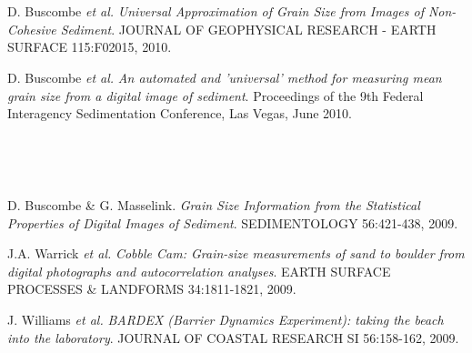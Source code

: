 \documentclass{article} %
\def\sf{\sffamily}
\def\sl{\slshape}
\newlength\sidebarwidth
\newcommand{\subtopic}[3][]
	 {\begin{minipage}{\textwidth}
	 \vspace*{.4\baselineskip}
         \nopagebreak\hspace{0in}%
         \nopagebreak\begin{minipage}[t]{\sidebarwidth - .2cm}
         \raggedleft {\sf\fontseries{sbc}\selectfont #2}
         {\\[-0.2\baselineskip] \textcolor{gray}{\footnotesize #1}}
	 \end{minipage}%
	 \hfill
	 \begin{minipage}[t]{\linewidth - \sidebarwidth}
	 #3%
	 \end{minipage}%
	 \vspace*{.2\baselineskip plus 1\baselineskip minus
	 .2\baselineskip}%
	 \end{minipage}}
\begin{document}
\subtopic{\hspace*{-3ex} 2010}{~
  \begin{itemize}[leftmargin=0ex, itemsep=0ex, parsep=.5ex, labelindent=-4ex]

    \publication
      D. Buscombe {\sl et al.}
      {\sl Universal Approximation of Grain Size from Images of Non-Cohesive Sediment}.
      JOURNAL OF GEOPHYSICAL RESEARCH - EARTH SURFACE 115:F02015, 2010.

    \publication
      D. Buscombe {\sl et al.}
      {\sl An automated and 'universal' method for measuring mean grain size from a digital image of sediment}.
      Proceedings of the 9th Federal Interagency Sedimentation Conference, Las Vegas, June 2010.

    \end{itemize}
}

\subtopic{\hspace*{-3ex} 2009}{~
  \begin{itemize}[leftmargin=0ex, itemsep=0ex, parsep=.5ex, labelindent=-4ex]

    \publication
      D. Buscombe \& G. Masselink.
      {\sl Grain Size Information from the Statistical Properties of Digital Images of Sediment}.
      SEDIMENTOLOGY 56:421-438, 2009.

    \publication
      J.A. Warrick {\sl et al.}
      {\sl Cobble Cam: Grain-size measurements of sand to boulder from digital photographs and autocorrelation analyses}.
      EARTH SURFACE PROCESSES \& LANDFORMS 34:1811-1821, 2009.

    \publication
      J. Williams {\sl et al.}
      {\sl BARDEX (Barrier Dynamics Experiment): taking the beach into the laboratory}.
      JOURNAL OF COASTAL RESEARCH SI 56:158-162, 2009.

    \end{itemize}
}
\end{document}
